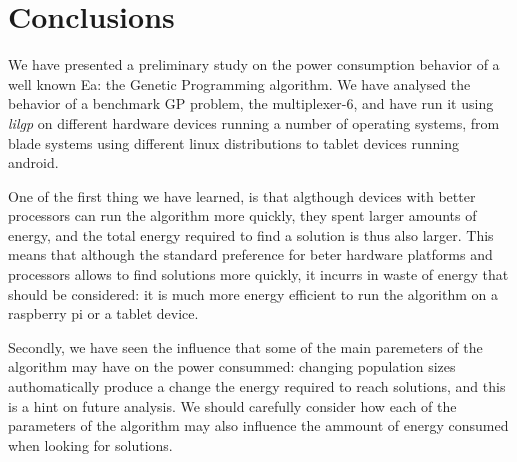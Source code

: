 \section{Conclusions}
\label{conclusions}

We have presented a preliminary study on the power consumption behavior of a well known Ea: the Genetic Programming algorithm.  We have analysed the behavior of a benchmark GP problem, the multiplexer-6, and have run it using \textit{lilgp} on different hardware devices running a number of operating systems, from blade systems using different linux distributions to tablet devices running android.

One of the first thing we have learned, is that algthough devices with better processors can run the algorithm more quickly, they spent larger amounts of energy, and the total energy required to find a solution is thus also larger.  This means that although the standard preference for beter hardware platforms and processors allows to find solutions more quickly, it incurrs in waste of energy that should be considered:  it is much more energy efficient to run the algorithm on a raspberry pi or a tablet device.

Secondly, we have seen the influence that some of the main paremeters of the algorithm may have on the power consummed:  changing population sizes authomatically produce a change the energy required to reach solutions, and this is a hint on future analysis.  We should carefully consider how each of the parameters of the algorithm may also influence the ammount of energy consumed when looking for solutions.